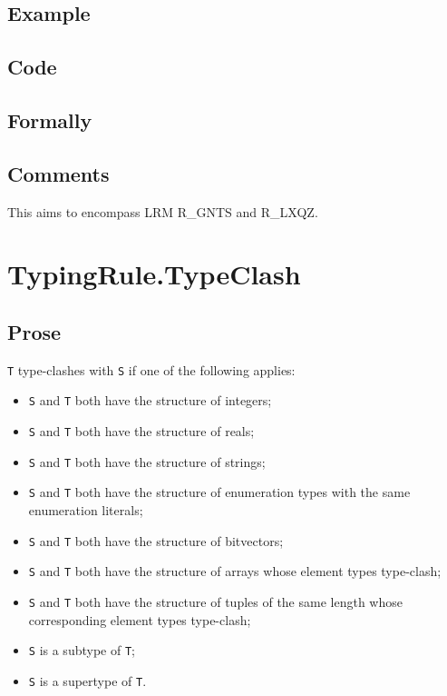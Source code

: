 \documentclass{book}
\begin{document}
  \subsection{Example}

  \subsection{Code}

\begin{emptyformal}
    \subsection{Formally}
\end{emptyformal}

\subsection{Comments}
  This aims to encompass LRM R\_GNTS and R\_LXQZ.

\section{TypingRule.TypeClash}

  \subsection{Prose}
  \texttt{T} type-clashes with \texttt{S} if one of the following applies:
  \begin{itemize}
  \item \texttt{S} and \texttt{T} both have the structure of integers;
  \item \texttt{S} and \texttt{T} both have the structure of reals;
  \item \texttt{S} and \texttt{T} both have the structure of strings;
  \item \texttt{S} and \texttt{T} both have the structure of enumeration types with the same enumeration literals;
  \item \texttt{S} and \texttt{T} both have the structure of bitvectors;
  \item \texttt{S} and \texttt{T} both have the structure of arrays whose element types type-clash;
  \item \texttt{S} and \texttt{T} both have the structure of tuples of the same length whose
    corresponding element types type-clash;
  \item \texttt{S} is a subtype of \texttt{T};
  \item \texttt{S} is a supertype of \texttt{T}.
  \end{itemize}
\end{document}
